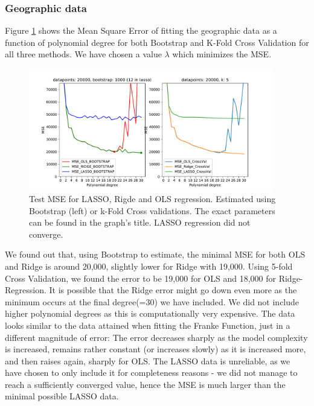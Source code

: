 \documentclass[11pt,a4paper,titlepage]{article}
\begin{document}
\subsubsection{Geographic data}
Figure \ref{fig:MSE_Korea} shows the Mean Square Error of fitting the geographic data as a function of polynomial degree for both Bootstrap and K-Fold Cross Validation for all three methods. We have chosen a value $\lambda$ which minimizes the MSE. 
\begin{figure}[H]
\centering
\includegraphics[width=0.95\textwidth]{figures/presentable_data/MSE_different_methods_Korea_LARGE.pdf}
\caption[Test MSE for LASSO, Rigde and OLS regression]{Test MSE for LASSO, Rigde and OLS regression. Estimated using Bootstrap (left) or k-Fold Cross validations. The exact parameters can be found in the graph's title. LASSO regression did not converge.}
\label{fig:MSE_Korea}
\end{figure}
We found out that, using Bootstrap to estimate, the minimal MSE for both OLS and Ridge is around 20,000, slightly lower for Ridge with 19,000. Using 5-fold Cross Validation, we found the error to be 19,000 for OLS and 18,000 for Ridge-Regression. It is possible that the Ridge error might go down even more as the minimum occurs at the final degree(=30) we have included. We did not include higher polynomial degrees as this is computationally very expensive. The data looks similar to the data attained when fitting the Franke Function, just in a different magnitude of error: The error decreases sharply as the model complexity is increased, remains rather constant (or increases slowly) as it is increased more, and then raises again, sharply for OLS. The LASSO data is unreliable, as we have chosen to only include it for completeness reasons - we did not manage to reach a sufficiently converged value, hence the MSE is much larger than the minimal possible LASSO data.\\
\end{document}
